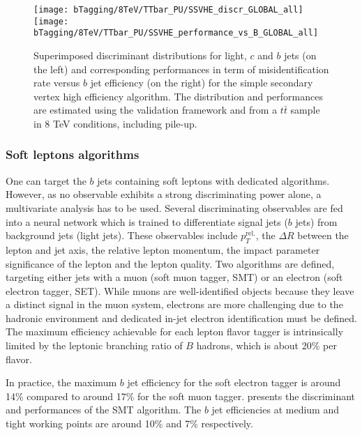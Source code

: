    \begin{figure}[th!]
        \centering
        \begin{minipage}{\textwidth}
        \texttt{[image: bTagging/8TeV/TTbar\_PU/SSVHE\_discr\_GLOBAL\_all]}
        \texttt{[image: bTagging/8TeV/TTbar\_PU/SSVHE\_performance\_vs\_B\_GLOBAL\_all]}
        \end{minipage}
        \caption{Superimposed discriminant distributions for light, $c$ and $b$ jets (on
        the left) and corresponding performances in term of misidentification rate versus $b$ jet efficiency
        (on the right) for the simple secondary vertex high efficiency algorithm.
        The distribution and performances are estimated using the validation framework and from
        a $t\bar{t}$ sample in 8 TeV conditions, including pile-up.}
        \label{fig:bTagging/perfSSV}
    \end{figure}

        \subsubsection{Soft leptons algorithms}

    One can target the $b$ jets containing soft leptons with dedicated algorithms. However,
    as no observable exhibits a strong discriminating power alone, a multivariate analysis
    has to be used. Several discriminating observables are fed into a neural network
    which is trained to differentiate signal jets ($b$ jets) from background jets (light jets).
    These observables include $p_T^\text{rel.}$, the $\Delta R$ between the lepton and
    jet axis, the relative lepton momentum, the impact parameter significance of the lepton
    and the lepton quality. Two algorithms are defined, targeting either jets with a
    muon (soft muon tagger, SMT) or an electron (soft electron tagger, SET). While muons are
    well-identified objects because they leave a distinct signal in the muon system,
    electrons are more challenging due to the hadronic environment and dedicated in-jet
    electron identification must be defined. The maximum efficiency achievable for each
    lepton flavor tagger is intrinsically limited by the leptonic branching ratio of $B$ hadrons,
    which is about 20\% per flavor.

    In practice, the maximum $b$ jet efficiency for the soft electron tagger is around
    14\% compared to around 17\% for the soft muon tagger.
     presents the discriminant and performances of the
    SMT algorithm. The $b$ jet efficiencies at medium and tight working points are around
    10\% and 7\% respectively.

